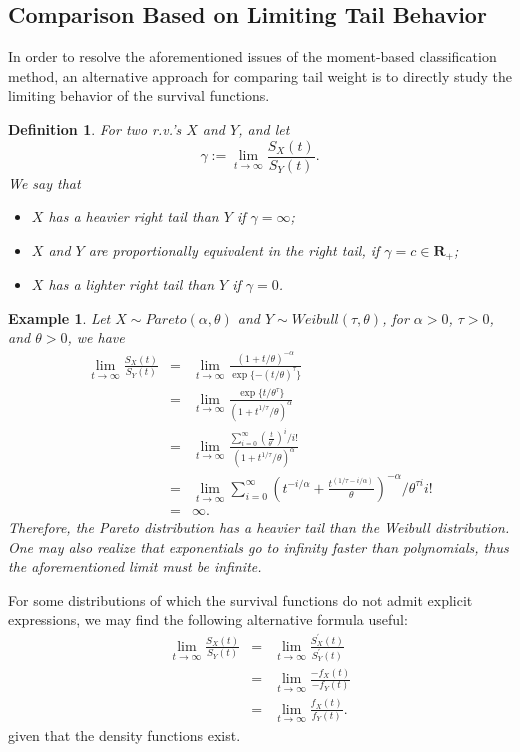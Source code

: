 \documentclass[12pt]{article}
\newtheorem{definition}{\bf Definition}
\newtheorem{example}{\bf Example}
\begin{document}
\subsection{Comparison Based on Limiting Tail Behavior}

In order to resolve the aforementioned issues of the moment-based classification method, an alternative approach for comparing tail weight is to directly study the limiting behavior of the survival functions.

\begin{definition} For two r.v.'s $X$ and $Y$, and let
\[
\gamma:=\lim_{t\rightarrow \infty}\frac{S_X(t)}{S_Y(t)}.
\]
We say that
\begin{itemize}
\item $X$ has a heavier right tail than $Y$ if $\gamma=\infty$;
\item $X$ and $Y$ are proportionally equivalent in the right tail, if $\gamma =c\in \mathbf{R}_+$;
\item $X$ has a lighter right tail than $Y$ if $\gamma=0$.
\end{itemize}
\end{definition}

\begin{example}
Let $X\sim Pareto(\alpha, \theta)$ and $Y\sim Weibull(\tau, \theta)$, for $\alpha>0$, $\tau>0$, and $\theta>0$, we have
\begin{eqnarray*}
    \lim_{t\rightarrow \infty}\frac{S_X(t)}{S_Y(t)} &=& \lim_{t\rightarrow \infty}\frac{(1+t/\theta)^{-\alpha}}{\exp\{-(t/\theta)^{\tau}\}} \\
    &=& \lim_{t\rightarrow \infty}\frac{\exp\{t/\theta^{\tau} \}}{(1+t^{1/\tau}/\theta)^{\alpha}} \\
    &=& \lim_{t\rightarrow \infty}\frac{\sum_{i=0}^{\infty}\left(\frac{t}{\theta^{\tau}}\right)^{i}/i!}{(1+t^{1/\tau}/\theta)^{\alpha}}\\
    &=& \lim_{t\rightarrow \infty} \sum_{i=0}^{\infty} \left(t^{-i/\alpha}+\frac{t^{(1/\tau-i/\alpha)}}{\theta} \right)^{-\alpha}/\theta^{\tau i}i!\\
    &=& \infty.
    \end{eqnarray*}
Therefore, the Pareto distribution has a heavier tail than the Weibull distribution.  One may also realize that exponentials go to infinity faster than polynomials, thus the aforementioned limit must be infinite.
\end{example}
For some distributions  of which the survival functions do not admit explicit expressions, we may find the following alternative formula useful:
\begin{eqnarray*}
    \lim_{t\to \infty} \frac{S_X(t)}{S_Y(t)} &=& \lim_{t \to \infty} \frac{S_X^{'}(t)}{S_Y^{'}(t)} \\
    &=& \lim_{t \to \infty} \frac{-f_X(t)}{-f_Y(t)}\\
 &=& \lim_{t\to \infty} \frac{f_X(t)}{f_Y(t)}.
\end{eqnarray*}
given that the density functions exist.
\end{document}
